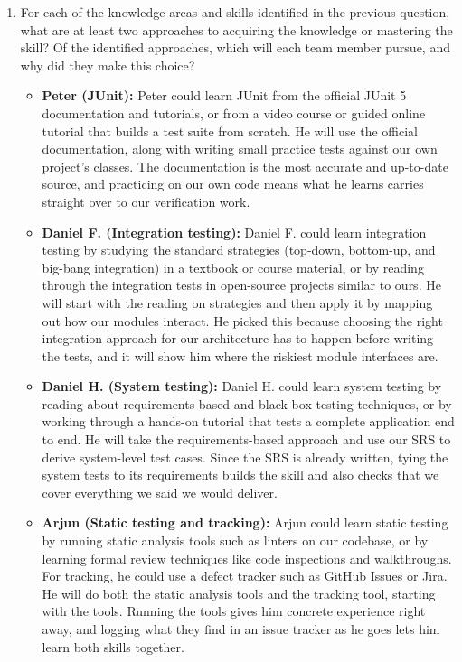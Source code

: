 \documentclass[12pt, titlepage]{article}
\begin{document}
\begin{enumerate}
  \item For each of the knowledge areas and skills identified in the previous
  question, what are at least two approaches to acquiring the knowledge or
  mastering the skill?  Of the identified approaches, which will each team
  member pursue, and why did they make this choice? \newline
  \begin{itemize}
    \item \textbf{Peter (JUnit):} Peter could learn JUnit from the official JUnit
    5 documentation and tutorials, or from a video course or guided online
    tutorial that builds a test suite from scratch. He will use the official
    documentation, along with writing small practice tests against our own
    project's classes. The documentation is the most accurate and up-to-date
    source, and practicing on our own code means what he learns carries straight
    over to our verification work.

    \item \textbf{Daniel F. (Integration testing):} Daniel F. could learn
    integration testing by studying the standard strategies (top-down,
    bottom-up, and big-bang integration) in a textbook or course material, or by
    reading through the integration tests in open-source projects similar to
    ours. He will start with the reading on strategies and then apply it by
    mapping out how our modules interact. He picked this because choosing the
    right integration approach for our architecture has to happen before writing
    the tests, and it will show him where the riskiest module interfaces are.

    \item \textbf{Daniel H. (System testing):} Daniel H. could learn system
    testing by reading about requirements-based and black-box testing
    techniques, or by working through a hands-on tutorial that tests a complete
    application end to end. He will take the requirements-based approach and use
    our SRS to derive system-level test cases. Since the SRS is already written,
    tying the system tests to its requirements builds the skill and also checks
    that we cover everything we said we would deliver.

    \item \textbf{Arjun (Static testing and tracking):} Arjun could learn static
    testing by running static analysis tools such as linters on our codebase, or
    by learning formal review techniques like code inspections and walkthroughs.
    For tracking, he could use a defect tracker such as GitHub Issues or Jira. He
    will do both the static analysis tools and the tracking tool, starting with
    the tools. Running the tools gives him concrete experience right away, and
    logging what they find in an issue tracker as he goes lets him learn both
    skills together.


\end{itemize}
\end{enumerate}
\end{document}

